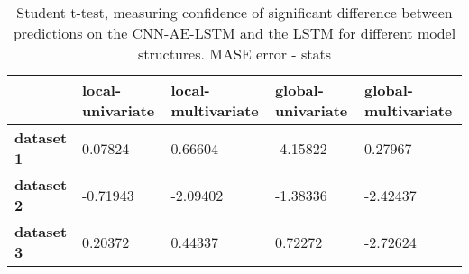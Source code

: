 \begin{table}[H]
\centering
\caption{Student t-test, measuring confidence of significant difference between predictions on the CNN-AE-LSTM and the LSTM for different model structures. MASE error - stats}
\label{table:ttest-stats-main-experiments-MASE}
\begin{tabular}{lllll}
\toprule
{} & local-univariate & local-multivariate & global-univariate & global-multivariate \\
\midrule
\textbf{dataset 1} &          0.07824 &            0.66604 &          -4.15822 &             0.27967 \\
\textbf{dataset 2} &         -0.71943 &           -2.09402 &          -1.38336 &            -2.42437 \\
\textbf{dataset 3} &          0.20372 &            0.44337 &           0.72272 &            -2.72624 \\
\bottomrule
\end{tabular}
\end{table}
